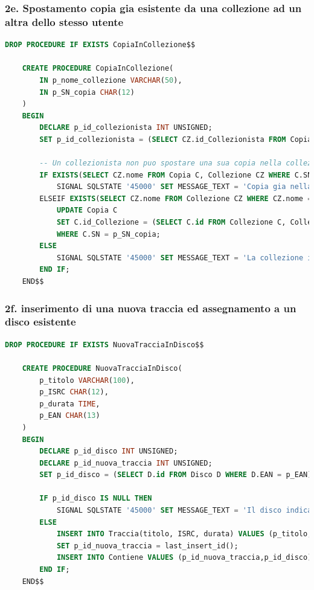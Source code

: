 \documentclass{article}
\begin{document}
\subsubsection*{2e. Spostamento copia gia esistente da una collezione ad un altra dello stesso utente}
\begin{lstlisting}[language=SQL]
    DROP PROCEDURE IF EXISTS CopiaInCollezione$$

    CREATE PROCEDURE CopiaInCollezione(
        IN p_nome_collezione VARCHAR(50),
        IN p_SN_copia CHAR(12)
    )
    BEGIN
        DECLARE p_id_collezionista INT UNSIGNED;
        SET p_id_collezionista = (SELECT CZ.id_Collezionista FROM Copia C, Collezione CZ WHERE C.SN = p_SN_copia AND CZ.id = C.id_Collezione);
        
        -- Un collezionista non puo spostare una sua copia nella collezione di un altro utente
        IF EXISTS(SELECT CZ.nome FROM Copia C, Collezione CZ WHERE C.SN = p_SN_copia AND C.id_collezione = CZ.id AND CZ.nome = p_nome_collezione AND CZ.id_collezionista = p_id_collezionista) THEN
            SIGNAL SQLSTATE '45000' SET MESSAGE_TEXT = 'Copia gia nella collezione';
        ELSEIF EXISTS(SELECT CZ.nome FROM Collezione CZ WHERE CZ.nome = p_nome_collezione AND CZ.id_collezionista = p_id_collezionista) THEN
            UPDATE Copia C
            SET C.id_Collezione = (SELECT C.id FROM Collezione C, Collezionista CL WHERE C.nome = p_nome_collezione AND CL.id = p_id_collezionista)
            WHERE C.SN = p_SN_copia;
        ELSE
            SIGNAL SQLSTATE '45000' SET MESSAGE_TEXT = 'La collezione indicata non esiste';
        END IF;
    END$$
\end{lstlisting}
    
\subsubsection*{2f. inserimento di una nuova traccia ed assegnamento a un disco esistente}
\begin{lstlisting}[language=SQL]
    DROP PROCEDURE IF EXISTS NuovaTracciaInDisco$$

    CREATE PROCEDURE NuovaTracciaInDisco(
        p_titolo VARCHAR(100),
        p_ISRC CHAR(12),
        p_durata TIME,
        p_EAN CHAR(13)
    )
    BEGIN
        DECLARE p_id_disco INT UNSIGNED;
        DECLARE p_id_nuova_traccia INT UNSIGNED;
        SET p_id_disco = (SELECT D.id FROM Disco D WHERE D.EAN = p_EAN);
        
        IF p_id_disco IS NULL THEN
            SIGNAL SQLSTATE '45000' SET MESSAGE_TEXT = 'Il disco indicato non esiste'; 
        ELSE
            INSERT INTO Traccia(titolo, ISRC, durata) VALUES (p_titolo, p_ISRC, p_durata);
            SET p_id_nuova_traccia = last_insert_id();
            INSERT INTO Contiene VALUES (p_id_nuova_traccia,p_id_disco);
        END IF;
    END$$
\end{lstlisting}
        
\end{document}

